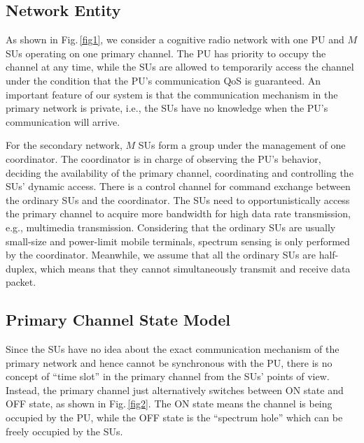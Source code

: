 \documentclass[11pt,draftcls]{IEEEtran}{\onecolumn}
\begin{document}
\subsection{Network Entity}

As shown in Fig.\,\ref{fig1}, we consider a cognitive radio network
with one PU and $M$ SUs operating on one primary channel. The PU has
priority to occupy the channel at any time, while the SUs are
allowed to temporarily access the channel under the condition that
the PU's communication QoS is guaranteed. An important feature of
our system is that the communication mechanism in the primary
network is private, i.e., the SUs have no knowledge when the PU's
communication will arrive.

For the secondary network, $M$ SUs form a group under the management
of one coordinator. The coordinator is in charge of observing the
PU's behavior, deciding the availability of the primary channel,
coordinating and controlling the SUs' dynamic access. There is a
control channel for command exchange between the ordinary SUs
and the coordinator. The SUs need to opportunistically access the primary
channel to acquire more bandwidth for high data rate transmission,
e.g., multimedia transmission. Considering that the ordinary SUs are
usually small-size and power-limit mobile terminals, spectrum
sensing is only performed by the coordinator. Meanwhile, we assume
that all the ordinary SUs are half-duplex, which means that they
cannot simultaneously transmit and receive data packet.

\subsection{Primary Channel State Model}\label{ONOFF}

Since the SUs have no idea about the exact communication mechanism
of the primary network and hence cannot be synchronous with the PU,
there is no concept of ``time slot'' in the primary channel from the
SUs' points of view. Instead, the primary channel just alternatively
switches between ON state and OFF state, as shown in
Fig.\,\ref{fig2}. The ON state means the channel is being occupied
by the PU, while the OFF state is the ``spectrum hole'' which can be
freely occupied by the SUs.
\end{document}
